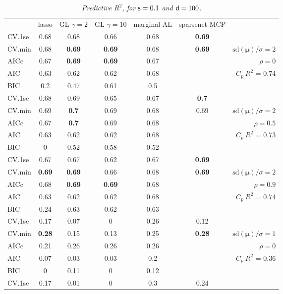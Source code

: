 \documentclass[12pt]{article}
\newcommand{\mr}[1]{\mathrm{#1}}
\newcommand{\bm}[1]{\mathbf{#1}}
\begin{document}
\begin{table}[p]\vspace{-.5cm}
\caption[l]{\label{r2}\it Predictive $R^2$, for ${\sf s}=0.1$ and  ${\sf d}=100$.}
\vspace{-.5cm}
\small{}
\begin{center}
\begin{tabular}{l*{5}{c}|r}
 & lasso & GL $\gamma=2$ & GL $\gamma=10$ & marginal AL & sparsenet MCP  &  \\
\cline{1-7}
CV.1se & 0.68 & 0.68 & 0.66 & 0.68 & {\bf 0.69} &\\
CV.min & 0.68 & {\bf 0.69} & {\bf 0.69} & 0.68 & {\bf 0.69} &  $\mr{sd}(\bm{\mu})/\sigma=2$ \\
AICc & 0.67 & {\bf 0.69} & {\bf 0.69} & 0.67 & & $\rho=0$ \\
AIC & 0.63 & 0.62 & 0.62 & 0.68 & & \multirow{2}{*}{$C_p ~ R^2$ = 0.74} \\
BIC & 0.2 & 0.47 & 0.61 & 0.5 & & \\
 \hline 
CV.1se & 0.68 & 0.69 & 0.65 & 0.67 & {\bf 0.7} &\\
CV.min & 0.69 & {\bf 0.7} & 0.69 & 0.68 & 0.69 &  $\mr{sd}(\bm{\mu})/\sigma=2$ \\
AICc & 0.67 & {\bf 0.7} & 0.69 & 0.68 & & $\rho=0.5$ \\
AIC & 0.63 & 0.62 & 0.62 & 0.68 & & \multirow{2}{*}{$C_p ~ R^2$ = 0.73} \\
BIC & 0 & 0.52 & 0.58 & 0.52 & & \\
 \hline 
CV.1se & 0.67 & 0.67 & 0.62 & 0.67 & {\bf 0.69} &\\
CV.min & {\bf 0.69} & {\bf 0.69} & 0.66 & 0.68 & {\bf 0.69} &  $\mr{sd}(\bm{\mu})/\sigma=2$ \\
AICc & 0.68 & {\bf 0.69} & {\bf 0.69} & 0.68 & & $\rho=0.9$ \\
AIC & 0.63 & 0.62 & 0.62 & 0.68 & & \multirow{2}{*}{$C_p ~ R^2$ = 0.74} \\
BIC & 0.24 & 0.63 & 0.62 & 0.63 & & \\
 \hline 
CV.1se & 0.17 & 0.07 & 0 & 0.26 & 0.12 &\\
CV.min & {\bf 0.28} & 0.15 & 0.13 & 0.25 & {\bf 0.28} &  $\mr{sd}(\bm{\mu})/\sigma=1$ \\
AICc & 0.21 & 0.26 & 0.26 & 0.26 & & $\rho=0$ \\
AIC & 0.07 & 0.03 & 0.03 & 0.2 & & \multirow{2}{*}{$C_p ~ R^2$ = 0.36} \\
BIC & 0 & 0.11 & 0 & 0.12 & & \\
 \hline 
CV.1se & 0.17 & 0.01 & 0 & 0.3 & 0.24 &\\

\end{tabular}
\end{center}
\end{table}
\end{document}
